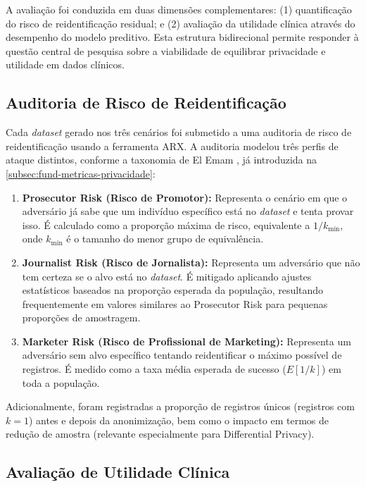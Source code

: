 A avaliação foi conduzida em duas dimensões complementares: (1) quantificação do risco de reidentificação residual; e (2) avaliação da utilidade clínica através do desempenho do modelo preditivo. Esta estrutura bidirecional permite responder à questão central de pesquisa sobre a viabilidade de equilibrar privacidade e utilidade em dados clínicos.

\subsection{Auditoria de Risco de Reidentificação}

Cada \textit{dataset} gerado nos três cenários foi submetido a uma auditoria de risco de reidentificação usando a ferramenta ARX. A auditoria modelou três perfis de ataque distintos, conforme a taxonomia de El Emam \cite{ElEmam2013}, já introduzida na \autoref{subsec:fund-metricas-privacidade}:

\begin{enumerate}
    \item \textbf{Prosecutor Risk (Risco de Promotor):} Representa o cenário em que o adversário já sabe que um indivíduo específico está no \textit{dataset} e tenta provar isso. É calculado como a proporção máxima de risco, equivalente a $1/k_{\min}$, onde $k_{\min}$ é o tamanho do menor grupo de equivalência.
    
    \item \textbf{Journalist Risk (Risco de Jornalista):} Representa um adversário que não tem certeza se o alvo está no \textit{dataset}. É mitigado aplicando ajustes estatísticos baseados na proporção esperada da população, resultando frequentemente em valores similares ao Prosecutor Risk para pequenas proporções de amostragem.
    
    \item \textbf{Marketer Risk (Risco de Profissional de Marketing):} Representa um adversário sem alvo específico tentando reidentificar o máximo possível de registros. É medido como a taxa média esperada de sucesso ($E[1/k]$) em toda a população.
\end{enumerate}

Adicionalmente, foram registradas a proporção de registros únicos (registros com $k=1$) antes e depois da anonimização, bem como o impacto em termos de redução de amostra (relevante especialmente para Differential Privacy).

\subsection{Avaliação de Utilidade Clínica}

